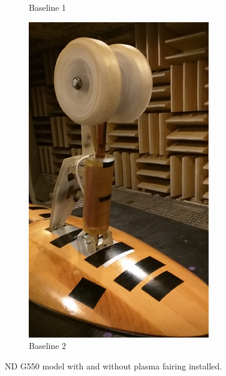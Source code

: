 \begin{figure}
\begin{center}
\begin{subfigure}{0.45\textwidth}
\caption{Baseline 1}
\label{fig:mod1a}
\end{subfigure}
\hspace*{\fill} %
\begin{subfigure}{0.45\textwidth}
\includegraphics[width=\linewidth]{figures/model1b}
\caption{Baseline 2}
\label{fig:mod1b}
\end{subfigure}
\caption{ND G550 model with and without plasma fairing installed.}
\end{center}
\end{figure}

